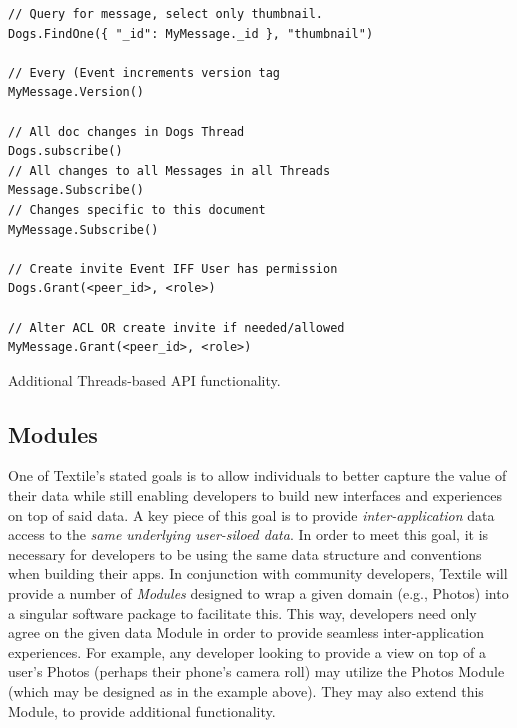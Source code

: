 \documentclass{textile}
\begin{document}
\begin{example}
  \begin{minipage}{.45\textwidth}
    \begin{lstlisting}
// Query for message, select only thumbnail.
Dogs.FindOne({ "_id": MyMessage._id }, "thumbnail")

// Every (Event increments version tag
MyMessage.Version()

// All doc changes in Dogs Thread
Dogs.subscribe()
// All changes to all Messages in all Threads
Message.Subscribe() 
// Changes specific to this document
MyMessage.Subscribe() 

// Create invite Event IFF User has permission
Dogs.Grant(<peer_id>, <role>)

// Alter ACL OR create invite if needed/allowed
MyMessage.Grant(<peer_id>, <role>)
    \end{lstlisting}
  \end{minipage}
\caption{Additional Threads-based API functionality.}
\label{ex:others}
\end{example}

\subsection{Modules}\label{sec:modules}

One of Textile's stated goals is to allow individuals to better capture the value of their data while still enabling developers to build new interfaces and experiences on top of said data. A key piece of this goal is to provide \emph{inter-application} data access to the \emph{same underlying user-siloed data}. In order to meet this goal, it is necessary for developers to be using the same data structure and conventions when building their apps. In conjunction with community developers, Textile will provide a number of \emph{Modules} designed to wrap a given domain (e.g., Photos) into a singular software package to facilitate this. This way, developers need only agree on the given data Module in order to provide seamless inter-application experiences. For example, any developer looking to provide a view on top of a user's Photos (perhaps their phone's camera roll) may utilize the Photos Module (which may be designed as in the example above). They may also extend this Module, to provide additional functionality.
\end{document}
